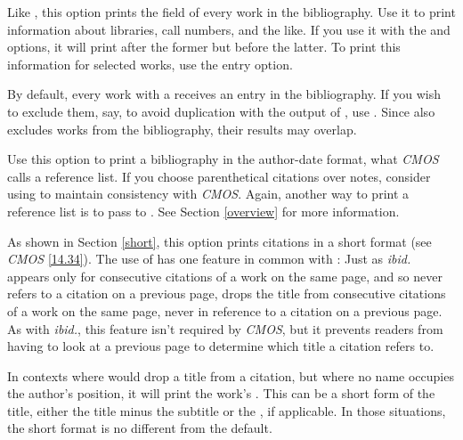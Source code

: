 \documentclass[11pt,letterpaper,oneside]{article}
\begin{document}
\begin{optionlist}

\noindent Like , this option prints the 
field of every work in the bibliography. Use it to print information
about libraries, call numbers, and the like. If you use it with the
 and  options, it will print after the
former but before the latter. To print this information for selected
works, use the  entry option.


\noindent By default, every work with a  receives
an entry in the bibliography. If you wish to exclude them, say, to
avoid duplication with the output of , use
. Since  also excludes works from the
bibliography, their results may overlap.


\noindent Use this option to print a bibliography in the author-date
format, what \textit{CMOS} calls a reference list. If you choose
parenthetical citations over notes, consider using  to
maintain consistency with \textit{CMOS}. Again, another way to print a
reference list is to pass  to
. See Section \ref{overview} for more
information.


\noindent As shown in Section \ref{short}, this option prints
citations in a short format (see \textit{CMOS} \ref{14.34}). The use
of  has one feature in common with : Just as
\textit{ibid.} appears only for consecutive citations of a work on the
same page, and so never refers to a citation on a previous page,
 drops the title from consecutive citations of a work on
the same page, never in reference to a citation on a previous page. As
with \textit{ibid.}, this feature isn't required by \textit{CMOS}, but
it prevents readers from having to look at a previous page to
determine which title a citation refers to.

In contexts where  would drop a title from a citation, but
where no name occupies the author's position, it will print the work's
. This can be a short form of the title, either
the title minus the subtitle or the , if
applicable. In those situations, the short format is no different from
the default.


\end{optionlist}
\end{document}
